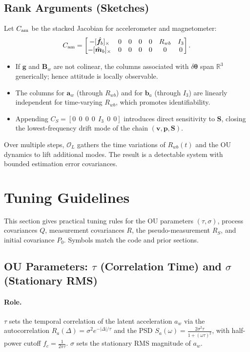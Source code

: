 \documentclass[10pt]{extarticle}
\begin{document}
\subsection{Rank Arguments (Sketches)}
Let $C_{\rm am}$ be the stacked Jacobian for accelerometer and magnetometer:
\[
C_{\rm am}=
\begin{bmatrix}
-[\hat{\bm f}_b]_\times & 0 & 0 & 0 & 0 & R_{wb} & I_3\\
-[\hat{\bm m}_b]_\times & 0 & 0 & 0 & 0 & 0 & 0
\end{bmatrix}.
\]
\begin{itemize}
\item If $\bm g$ and $\bm B_w$ are not colinear, the columns associated with $\delta\bm\theta$
span $\mathbb{R}^3$ generically; hence attitude is locally observable.
\item The columns for $\bm a_w$ (through $R_{wb}$) and for $\bm b_a$ (through $I_3$)
are linearly independent for time-varying $R_{wb}$, which promotes identifiability.
\item Appending $C_S=[0\;\,0\;\,0\;\,0\;\,I_3\;\,0\;\,0]$ introduces direct sensitivity to $\bm S$,
closing the lowest-frequency drift mode of the chain $(\bm v,\bm p,\bm S)$.
\end{itemize}
Over multiple steps, $\mathcal{O}_L$ gathers the time variations of $R_{wb}(t)$ and the OU dynamics
to lift additional modes. The result is a detectable system with bounded estimation error covariances.


\section{Tuning Guidelines}
\label{sec:tuning}

This section gives practical tuning rules for the OU parameters $(\tau,\sigma)$,
process covariances $Q$, measurement covariances $R$, the pseudo-measurement $R_S$,
and initial covariance $P_0$. Symbols match the code and prior sections.

\subsection{OU Parameters: $\tau$ (Correlation Time) and $\sigma$ (Stationary RMS)}
\paragraph{Role.}
$\tau$ sets the temporal correlation of the latent acceleration $a_w$ via the
autocorrelation $R_a(\Delta)=\sigma^2 e^{-|\Delta|/\tau}$ and the PSD
$S_a(\omega)=\frac{2\sigma^2\tau}{1+(\omega\tau)^2}$, with half-power cutoff
$f_c=\frac{1}{2\pi\tau}$. $\sigma$ sets the stationary RMS magnitude of $a_w$.
\end{document}
